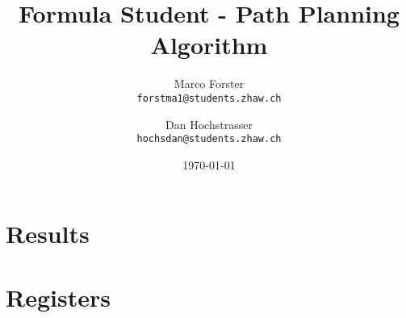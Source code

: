 \documentclass[a4paper, 12pt]{report}
\title{Formula Student - Path Planning Algorithm}
\author{
  Marco Forster\\
  \texttt{forstma1@students.zhaw.ch}
  \and
  Dan Hochstrasser\\
  \texttt{hochsdan@students.zhaw.ch}
}
\date{\today}
\begin{document}
\begin{sloppypar}






  \setcounter{secnumdepth}{3}




  \chapter{Results} \label{ch:Results}
  


  \chapter{Registers} \label{ch:Registers}
  


\end{sloppypar}
\end{document}
